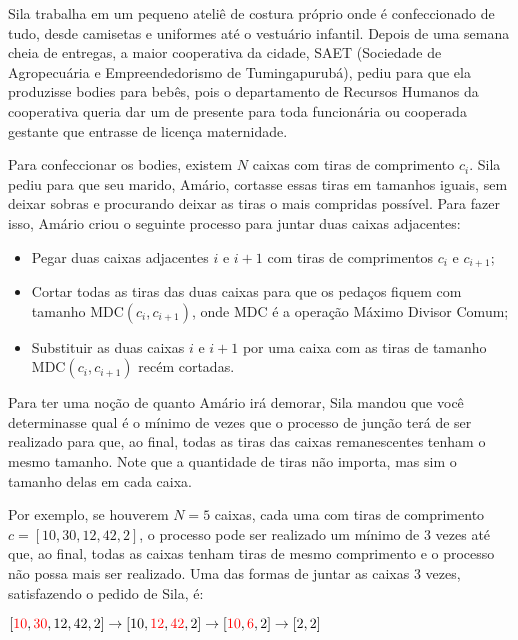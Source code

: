 Sila trabalha em um pequeno ateliê de costura próprio onde é confeccionado de tudo, desde camisetas e uniformes até o vestuário infantil. Depois de uma semana cheia de entregas, a maior cooperativa da cidade, SAET (Sociedade de Agropecuária e Empreendedorismo de Tumingapurubá), pediu para que ela produzisse bodies para bebês, pois o departamento de Recursos Humanos da cooperativa queria dar um de presente para toda funcionária ou cooperada gestante que entrasse de licença maternidade. 

Para confeccionar os bodies, existem $N$ caixas com tiras de comprimento $c_i$. Sila pediu para que seu marido, Amário, cortasse essas tiras em tamanhos iguais, sem deixar sobras e procurando deixar as tiras o mais compridas possível. Para fazer isso, Amário criou o seguinte processo para juntar duas caixas adjacentes:

\begin{itemize}
    \item Pegar duas caixas adjacentes $i$ e $i+1$ com tiras de comprimentos $c_i$ e $c_{i+1}$;
    \item Cortar todas as tiras das duas caixas para que os pedaços fiquem com tamanho MDC$(c_i, c_{i+1})$, onde MDC é a operação Máximo Divisor Comum;
    \item Substituir as duas caixas $i$ e $i+1$ por uma caixa com as tiras de tamanho MDC$(c_i, c_{i+1})$ recém cortadas.
\end{itemize}

Para ter uma noção de quanto Amário irá demorar, Sila mandou que você determinasse qual é o mínimo de vezes que o processo de junção terá de ser realizado para que, ao final, todas as tiras das caixas remanescentes tenham o mesmo tamanho. Note que a quantidade de tiras não importa, mas sim o tamanho delas em cada caixa.

Por exemplo, se houverem $N=5$ caixas, cada uma com tiras de comprimento $c=[10,30,12,42,2]$, o processo pode ser realizado um mínimo de 3 vezes até que, ao final, todas as caixas tenham tiras de mesmo comprimento e o processo não possa mais ser realizado. Uma das formas de juntar as caixas 3 vezes, satisfazendo o pedido de Sila, é:

\begin{center}
    $[\textcolor{red}{10},\textcolor{red}{30},12,42,2] \rightarrow [10,\textcolor{red}{12},\textcolor{red}{42},2] \rightarrow [\textcolor{red}{10},\textcolor{red}{6},2] \rightarrow [2,2]$
\end{center}

